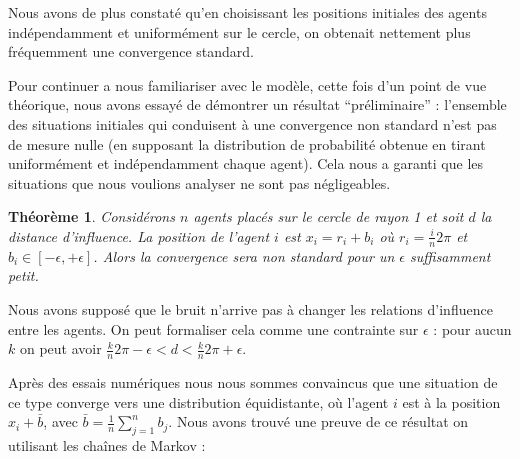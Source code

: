 \documentclass[a4paper,10pt]{article}
\newtheorem{theorem}{Théorème}
\begin{document}
Nous avons de plus constaté qu'en choisissant les positions initiales des agents indépendamment et uniformément sur le cercle, on obtenait nettement plus fréquemment une convergence standard. 

Pour continuer a nous familiariser avec le modèle, cette fois d'un point de vue théorique, nous avons essayé de démontrer un résultat ``préliminaire'' : l'ensemble des situations initiales qui conduisent à une convergence non standard n'est pas de mesure nulle (en supposant la distribution de probabilité obtenue en tirant uniformément et indépendamment chaque agent). Cela nous a garanti que les situations que nous voulions analyser ne sont pas négligeables.

\begin{theorem}
\label{convergence-non-standard}
Considérons $n$ agents placés sur le cercle de rayon 1 et soit $d$ la distance d'influence. La position de l'agent $i$ est $x_i = r_i + b_i$ où $r_i = \frac{i}{n} 2 \pi$ et $b_i \in [-\epsilon, +\epsilon]$. Alors la convergence sera non standard pour un $\epsilon$ suffisamment petit. 
\end{theorem}

Nous avons supposé que le bruit n'arrive pas à changer les relations d'influence entre les agents. On peut formaliser cela comme une contrainte sur $\epsilon$ : pour aucun $k$ on peut avoir $\frac{k}{n} 2 \pi - \epsilon < d < \frac{k}{n} 2 \pi + \epsilon$.

Après des essais numériques nous nous sommes convaincus que une situation de ce type converge vers une distribution équidistante, où l'agent $i$ est à la position $x_i + \bar b$, avec $\bar b = \frac{1}{n} \sum_{j=1}^n b_j$. Nous avons trouvé une preuve de ce résultat on utilisant les chaînes de Markov :
\end{document}
